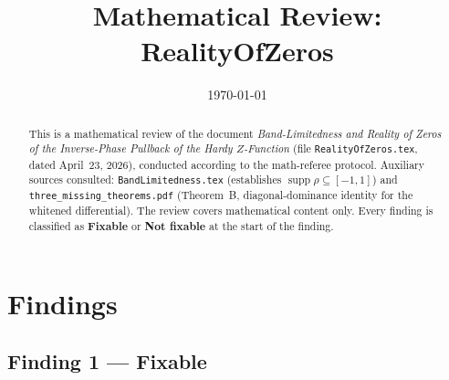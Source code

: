 \documentclass[11pt]{article}
\title{Mathematical Review: RealityOfZeros}
\author{}
\date{\today}
\begin{document}
\maketitle

\begin{abstract}
This is a mathematical review of the document
\emph{Band-Limitedness and Reality of Zeros of the Inverse-Phase Pullback of the
Hardy $Z$-Function} (file \texttt{RealityOfZeros.tex}, dated April~23, 2026),
conducted according to the math-referee protocol.
Auxiliary sources consulted: \texttt{BandLimitedness.tex}
(establishes $\operatorname{supp}\rho\subseteq[-1,1]$)
and \texttt{three\_missing\_theorems.pdf} (Theorem~B, diagonal-dominance identity
for the whitened differential).
The review covers mathematical content only.
Every finding is classified as \textbf{Fixable} or \textbf{Not fixable} at the start
of the finding.
\end{abstract}

\section*{Findings}

\subsection*{Finding 1 — Fixable}
\end{document}
